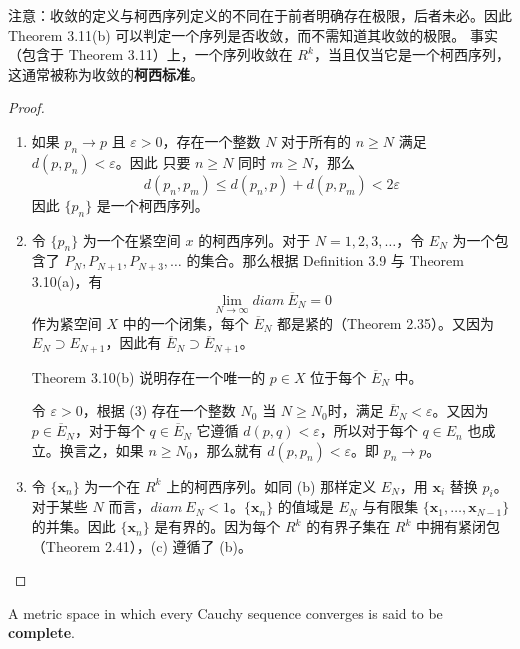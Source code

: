 \documentclass[../poma-notes.tex]{subfiles}
\begin{document}
注意：收敛的定义与柯西序列定义的不同在于前者明确存在极限，后者未必。因此 Theorem 3.11(b) 可以判定一个序列是否收敛，而不需知道其收敛的极限。
事实（包含于 Theorem 3.11）上，一个序列收敛在 $R^k$，当且仅当它是一个柯西序列，这通常被称为收敛的\textbf{柯西标准}。

\begin{proof}
  \begin{enumerate}[label=(\alph*)]
    \item 如果 $p_n \to p$ 且 $\varepsilon > 0$，存在一个整数 $N$ 对于所有的 $n \ge N$ 满足 $d(p,p_n) < \varepsilon$。因此
          只要 $n \ge N$ 同时 $m \ge N$，那么
          \[ d(p_n, p_m) \le d(p_n, p) + d(p, p_m) < 2\varepsilon \]
          因此 $\{p_n\}$ 是一个柯西序列。
    \item 令 $\{p_n\}$ 为一个在紧空间 $x$ 的柯西序列。对于 $N=1,2,3,\dots$，令 $E_N$ 为一个包含了 $P_N,P_{N+1},P_{N+3},\dots$
          的集合。那么根据 Definition 3.9 与 Theorem 3.10(a)，有
          \begin{equation}
            \lim_{N \to \infty} diam\ \overline{E}_N = 0
          \end{equation}
          作为紧空间 $X$ 中的一个闭集，每个 $\overline{E}_N$ 都是紧的（Theorem 2.35）。又因为 $E_N \supset E_{N+1}$，因此有
          $\overline{E}_N \supset \overline{E}_{N+1}$。

          Theorem 3.10(b) 说明存在一个唯一的 $p \in X$ 位于每个 $\overline{E}_N$ 中。

          令 $\varepsilon > 0$，根据 (3) 存在一个整数 $N_0$ 当 $N \ge N_0$时，满足 $\overline{E}_N < \varepsilon$。又因为
          $p \in \overline{E}_N$，对于每个 $q \in \overline{E}_N$ 它遵循 $d(p,q) < \varepsilon$，所以对于每个 $q \in E_n$
          也成立。换言之，如果 $n \ge N_0$，那么就有 $d(p,p_n)<\varepsilon$。即 $p_n \to p$。
    \item 令 $\{\mathbf{x}_n\}$ 为一个在 $R^k$ 上的柯西序列。如同 (b) 那样定义 $E_N$，用 $\mathbf{x}_i$ 替换 $p_i$。对于某些
          $N$ 而言，$diam\ E_N<1$。$\{\mathbf{x}_n\}$ 的值域是 $E_N$ 与有限集 $\{\mathbf{x}_1,\dots,\mathbf{x}_{N-1}\}$
          的并集。因此 $\{\mathbf{x}_n\}$ 是有界的。因为每个 $R^k$ 的有界子集在 $R^k$ 中拥有紧闭包（Theorem 2.41），(c) 遵循了
          (b)。
  \end{enumerate}
\end{proof}


\begin{definition}
  A metric space in which every Cauchy sequence converges is said to be \textbf{complete}.
\end{definition}
\end{document}
